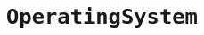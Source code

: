 \newpage
\chapter{\tt Operating\space System}
\thispagestyle{fancy}
\renewcommand*{\chaptername}{\tt Operating\space System}	
\section[\tt Linux]{\color{blue}{\tt Linux}}
\subsection[{\tt Linux}常见命令]{}
